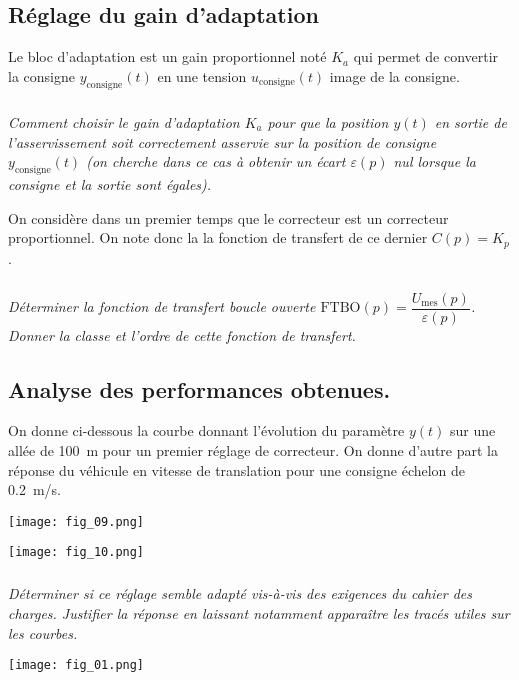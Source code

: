 \begin{multicols}{2}
\subsection*{Réglage du gain d’adaptation}

Le bloc d’adaptation est un gain proportionnel noté $K_a$ qui permet de convertir la consigne $y_{\text{consigne}}(t)$ en une tension $u_{\text{consigne}}(t)$ image de la consigne.  



\subparagraph{}
\textit{Comment choisir le gain d’adaptation $K_a$ pour que la position $y(t)$ en sortie de l’asservissement soit correctement asservie sur la position de consigne $y_{\text{consigne}} (t)$ (on cherche dans ce cas à obtenir un écart $\varepsilon(p)$ nul lorsque la consigne et la sortie sont égales).}
\ifprof
\begin{corrige}
\end{corrige}
\else
\fi

On considère dans un premier temps que le correcteur est un correcteur proportionnel. On note donc la la fonction de transfert de ce dernier $C(p) = K_p$.


\subparagraph{}
\textit{Déterminer la fonction de transfert boucle ouverte $\text{FTBO}(p)=\dfrac{U_{\text{mes}} (p)}{\varepsilon(p)}$.
Donner la classe et l’ordre de cette fonction de transfert. }
\ifprof
\begin{corrige}
\end{corrige}
\else
\fi

\subsection*{Analyse des performances obtenues.}

On donne ci-dessous la courbe donnant l’évolution du paramètre $y(t)$ sur une allée de \SI{100}{m} pour un premier réglage de correcteur. On donne d’autre part la réponse du véhicule en vitesse de translation pour une consigne échelon de \SI{0,2}{m/s}. 

\begin{center}
\texttt{[image: fig\_09.png]}
\end{center}


\begin{center}
\texttt{[image: fig\_10.png]}
\end{center}

\subparagraph{}
\textit{Déterminer si ce réglage semble adapté vis-à-vis des exigences du cahier des charges. Justifier la réponse en laissant notamment apparaître les tracés utiles sur les courbes. }
\ifprof
\begin{corrige}
\end{corrige}
\else
\fi

\end{multicols}

\begin{center}
\texttt{[image: fig\_01.png]}
\end{center}
